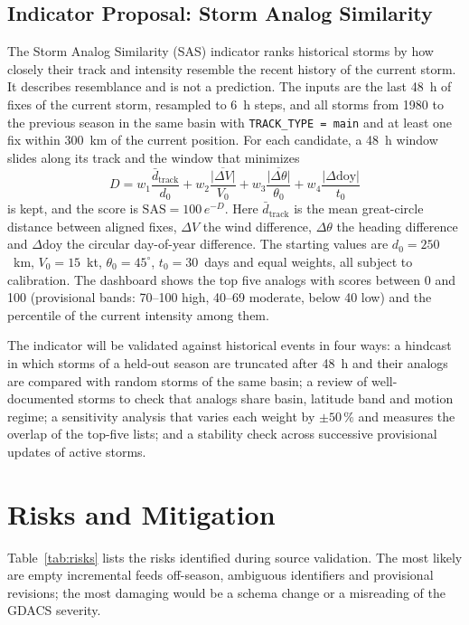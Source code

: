 \documentclass[10pt,twocolumn,letterpaper]{article}
\newcommand{\code}[1]{\texttt{\footnotesize #1}}
\begin{document}
\subsection{Indicator Proposal: Storm Analog Similarity}
The Storm Analog Similarity (SAS) indicator ranks historical storms by how closely their track and intensity resemble the recent history of the current storm. It describes resemblance and is not a prediction. The inputs are the last 48~h of fixes of the current storm, resampled to 6~h steps, and all storms from 1980 to the previous season in the same basin with \code{TRACK\_TYPE = main} and at least one fix within 300~km of the current position. For each candidate, a 48~h window slides along its track and the window that minimizes
\begin{equation}
D = w_1\frac{\bar{d}_{\mathrm{track}}}{d_0} + w_2\frac{\overline{|\Delta V|}}{V_0} + w_3\frac{\overline{|\Delta\theta|}}{\theta_0} + w_4\frac{|\Delta\mathrm{doy}|}{t_0}
\end{equation}
is kept, and the score is $\mathrm{SAS} = 100\,e^{-D}$. Here $\bar{d}_{\mathrm{track}}$ is the mean great-circle distance between aligned fixes, $\Delta V$ the wind difference, $\Delta\theta$ the heading difference and $\Delta\mathrm{doy}$ the circular day-of-year difference. The starting values are $d_0=250$~km, $V_0=15$~kt, $\theta_0=45^\circ$, $t_0=30$~days and equal weights, all subject to calibration. The dashboard shows the top five analogs with scores between 0 and 100 (provisional bands: 70--100 high, 40--69 moderate, below 40 low) and the percentile of the current intensity among them.

The indicator will be validated against historical events in four ways: a hindcast in which storms of a held-out season are truncated after 48~h and their analogs are compared with random storms of the same basin; a review of well-documented storms to check that analogs share basin, latitude band and motion regime; a sensitivity analysis that varies each weight by $\pm50\,\%$ and measures the overlap of the top-five lists; and a stability check across successive provisional updates of active storms.

\section{Risks and Mitigation}\label{sec:risks}

Table~\ref{tab:risks} lists the risks identified during source validation. The most likely are empty incremental feeds off-season, ambiguous identifiers and provisional revisions; the most damaging would be a schema change or a misreading of the GDACS severity.
\end{document}
